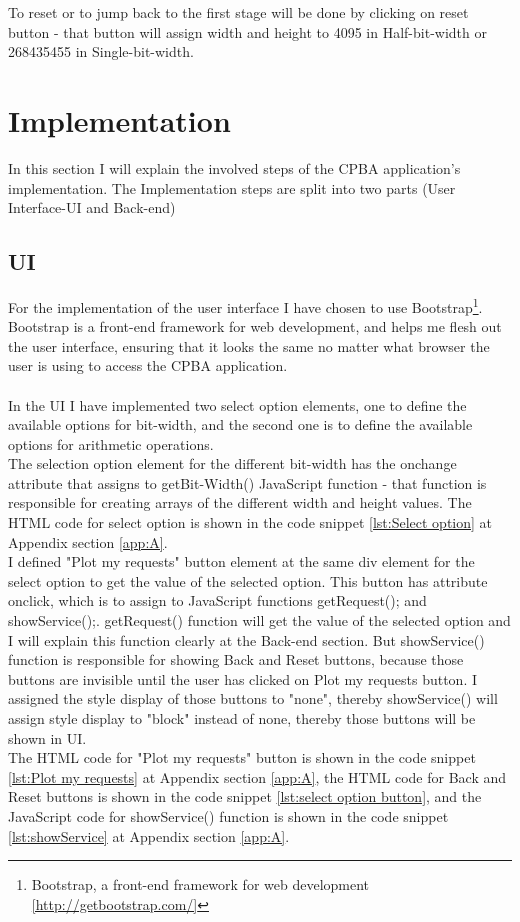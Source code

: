 \documentclass[11pt]{article}
\begin{document}
To reset or to jump back to the first stage will be done by clicking on reset button - that button will assign width and height to 4095 in Half-bit-width or 268435455 in Single-bit-width.

\section{Implementation}
In this section I will explain the involved steps of the CPBA application's implementation. The Implementation steps are split into two parts (User Interface-UI and Back-end)
\subsection{UI}
For the implementation of the user interface I have chosen to use Bootstrap\footnote{Bootstrap, a front-end framework for web development \ref{http://getbootstrap.com/}}. Bootstrap is a front-end framework for web development, and helps me flesh out the user interface, ensuring that it looks the same no matter what browser the user is using to access the CPBA application.\\\\
In the UI I have implemented two select option elements, one to define the available options for bit-width, and the second one is to define the available options for arithmetic operations.\\
The selection option element for the different bit-width has the onchange attribute that assigns to getBit-Width() JavaScript function - that function is responsible for creating arrays of the different width and height values. The HTML code for select option is shown in the code snippet \ref{lst:Select option} at Appendix section \ref{app:A}.\\

I defined "Plot my requests" button element at the same div element for the select option to get the value of the selected option. This button has attribute onclick, which is to assign to JavaScript functions getRequest(); and showService();. getRequest() function will get the value of the selected option and I will explain this function clearly at the Back-end section. But showService() function is responsible for showing Back and Reset buttons, because those buttons are invisible until the user has clicked on Plot my requests button. I assigned the style display of those buttons to "none", thereby showService() will assign style display to "block" instead of none, thereby those buttons will be shown in UI.\\
The HTML code for "Plot my requests" button is shown in the code snippet \ref{lst:Plot my requests} at Appendix section \ref{app:A}, the HTML code for Back and Reset buttons is shown in the code snippet \ref{lst:select option button}, and the JavaScript code for showService() function is shown in the code snippet \ref{lst:showService} at Appendix section \ref{app:A}.\\
\end{document}
